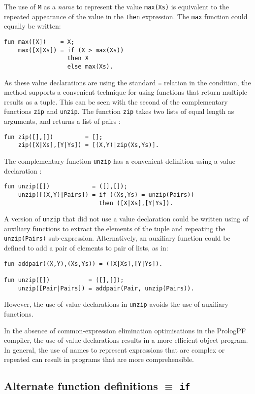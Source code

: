 The use of \texttt{M} as a \textit{name} to represent the value
\texttt{max(Xs)} is equivalent to the repeated appearance of
the value in the \texttt{then} expression.  The \texttt{max} function
could equally be written:
\begin{verbatim}
fun max([X])    = X;
    max([X|Xs]) = if (X > max(Xs))
                  then X
                  else max(Xs).
\end{verbatim}
As these value declarations are using the standard \texttt{=}
relation in the condition, the method supports a convenient
technique for using functions that return multiple results as a
tuple.  This can be seen with the second of the
complementary functions
\texttt{zip} and \texttt{unzip}.  The function \texttt{zip}
takes two lists of equal length as arguments, and returns a
list of pairs \cite{HAK+97}:
\begin{verbatim}
fun zip([],[])         = [];
    zip([X|Xs],[Y|Ys]) = [(X,Y)|zip(Xs,Ys)].
\end{verbatim}
The complementary function \texttt{unzip} has a convenient
definition using a value declaration \cite{Pau91}:
\begin{verbatim}
fun unzip([])            = ([],[]);
    unzip([(X,Y)|Pairs]) = if ((Xs,Ys) = unzip(Pairs))
                           then ([X|Xs],[Y|Ys]).
\end{verbatim}
A version of \texttt{unzip} that did not use a value
declaration could be written using of auxiliary functions to
extract the elements of the tuple and repeating the \texttt{unzip(Pairs)}
sub-expression.  Alternatively, an auxiliary function could be
defined to add a pair of elements to pair of lists, as in:
\begin{verbatim}
fun addpair((X,Y),(Xs,Ys)) = ([X|Xs],[Y|Ys]).

fun unzip([])           = ([],[]);
    unzip([Pair|Pairs]) = addpair(Pair, unzip(Pairs)).
\end{verbatim}
However, the use of value declarations in \texttt{unzip} avoids the
use of auxiliary functions.

In the absence of common-expression elimination optimisations in the
PrologPF compiler, the use of value declarations results in a more efficient
object program.  In general, the use of names to represent expressions
that are complex or repeated can result in programs that are more
comprehensible.

\subsection{Alternate function definitions $\equiv$ \texttt{if}}
\label{alt_if}

